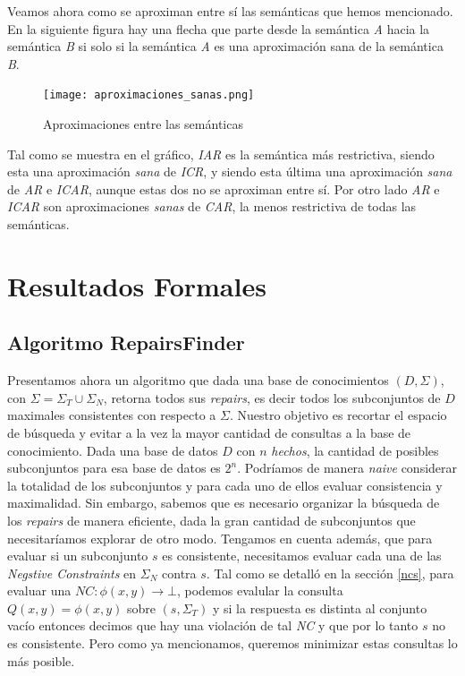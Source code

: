 \documentclass[11pt,a4paper,twoside]{tesis}
\begin{document}
Veamos ahora como se aproximan entre sí las semánticas que hemos mencionado. En la siguiente figura hay una flecha que parte desde la semántica \textit{A} hacia la semántica \textit{B} si solo si la semántica \textit{A} es una aproximación sana de la semántica \textit{B}.


\begin{figure}[ht]
    \texttt{[image: aproximaciones\_sanas.png]}
    \centering
    \caption{Aproximaciones entre las semánticas}
    \label{fig:aproximaciones}
\end{figure}

Tal como se muestra en el gráfico, \textit{IAR} es la semántica más restrictiva, siendo esta una aproximación \textit{sana} de \textit{ICR}, y siendo esta última una aproximación \textit{sana} de \textit{AR} e \textit{ICAR}, aunque estas dos no se aproximan entre sí. Por otro lado \textit{AR} e \textit{ICAR} son aproximaciones \textit{sanas} de \textit{CAR}, la menos restrictiva de todas las semánticas. 

\chapter{Resultados Formales}
\section{Algoritmo RepairsFinder}\label{repairs_finder_section}
Presentamos ahora un algoritmo que dada una base de conocimientos $(D, \Sigma)$, con $\Sigma = \Sigma_T \cup \Sigma_N$, retorna todos sus \textit{repairs}, es decir todos los subconjuntos de $D$ maximales consistentes con respecto a $\Sigma$. Nuestro objetivo es recortar el espacio de búsqueda y evitar a la vez la mayor cantidad de consultas a la base de conocimiento. Dada una base de datos $D$ con $n$ \textit{hechos}, la cantidad de posibles subconjuntos para esa base de datos es $2^n$. Podríamos de manera \textit{naive} considerar la totalidad de los subconjuntos y para cada uno de ellos evaluar consistencia y maximalidad. Sin embargo, sabemos que es necesario organizar la búsqueda de los \textit{repairs} de manera eficiente, dada la gran cantidad de subconjuntos que necesitaríamos explorar de otro modo. Tengamos en cuenta además, que para evaluar si un subconjunto $s$ es consistente, necesitamos evaluar cada una de las \textit{Negstive Constraints} en $\Sigma_N$ contra $s$. Tal como se detalló en la sección \ref{ncs}, para evaluar una $NC: \phi(x, y) \rightarrow \bot$, podemos evalular la consulta $Q(x, y) = \phi(x, y)$ sobre $(s, \Sigma_T)$ y si la respuesta es distinta al conjunto vacío entonces decimos que hay una violación de tal \textit{NC} y que por lo tanto $s$ no es consistente. Pero como ya mencionamos, queremos minimizar estas consultas lo más posible.
\end{document}
